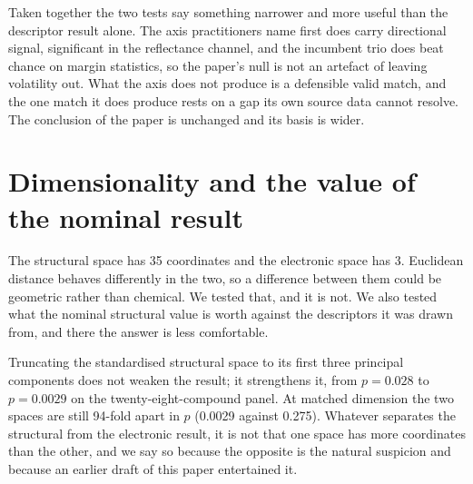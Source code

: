 \documentclass[journal=jacsat,manuscript=suppinfo,margin=1in]{achemso}
\begin{document}
Taken together the two tests say something narrower and more useful than the
descriptor result alone. The axis practitioners name first does carry
directional signal, significant in the reflectance channel, and the incumbent
trio does beat chance on margin statistics, so the paper's null is not an
artefact of leaving volatility out.
What the axis does not produce is a defensible valid match, and the one match
it does produce rests on a gap its own source data cannot resolve. The conclusion of the paper is unchanged and its
basis is wider.

\begin{table}[!htb]
\centering
\caption{Adopted vapour pressures for the twenty-eight-compound panel, in
descending order. Values are measurements retrieved from PubChem, which
carries them from the Hazardous Substances Data Bank and from the government
compendia named in the source column; the adoption rule and the tier
definitions are in the text. No value was converted between temperatures.}
\label{tab:volatility}
\footnotesize

\end{table}

\begin{table}[!htb]
\centering
\caption{What each agent is nearest to on the volatility axis. The series
column is the agent's own class. For three of the eleven agents the nearest
compound in the pool is an interferent rather than a simulant. This table is
descriptive and enters no multiplicity accounting.}
\label{tab:vpairing}
\small
\setlength{\tabcolsep}{4pt}

\end{table}

\section{Dimensionality and the value of the nominal result}
\label{res:dimdetail}

The structural space has 35 coordinates and the electronic space has 3. Euclidean
distance behaves differently in the two, so a difference between them could be
geometric rather than chemical. We tested that, and it is not. We also tested
what the nominal structural value is worth against the descriptors it was drawn
from, and there the answer is less comfortable.

Truncating the standardised structural space to its first three principal
components does not weaken the result; it strengthens it, from $p=0.028$ to
$p=0.0029$ on the twenty-eight-compound panel. At matched dimension the two
spaces are still 94-fold apart in $p$ (0.0029 against 0.275). Whatever separates
the structural from the electronic result, it is not that one space has more
coordinates than the other, and we say so because the opposite is the natural
suspicion and because an earlier draft of this paper entertained it.
\end{document}
